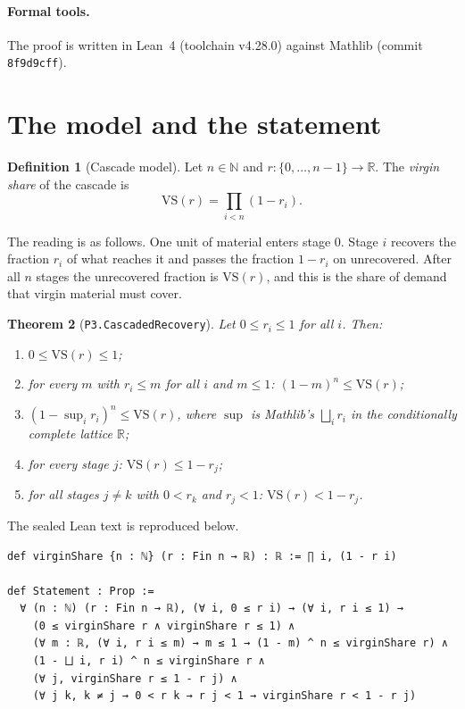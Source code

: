 \documentclass[11pt]{article}
\newtheorem{theorem}{Theorem}
\theoremstyle{definition}
\newtheorem{definition}[theorem]{Definition}
\theoremstyle{remark}
\begin{document}
\paragraph{Formal tools.}
The proof is written in Lean~4 \citep{moura2021lean4} (toolchain v4.28.0) against Mathlib
\citep{mathlib2020} (commit \texttt{8f9d9cff}).

\section{The model and the statement}
\label{sec:model}
\begin{definition}[Cascade model]
Let $n\in\mathbb{N}$ and $r:\{0,\dots,n-1\}\to\mathbb{R}$. The \emph{virgin share} of the cascade
is
\[
\mathrm{VS}(r)=\prod_{i<n}(1-r_i).
\]
\end{definition}
The reading is as follows. One unit of material enters stage $0$. Stage $i$ recovers the fraction
$r_i$ of what reaches it and passes the fraction $1-r_i$ on unrecovered. After all $n$ stages the
unrecovered fraction is $\mathrm{VS}(r)$, and this is the share of demand that virgin material
must cover.

\begin{theorem}[\texttt{P3.CascadedRecovery}]\label{thm:main}
Let $0\le r_i\le1$ for all $i$. Then:
\begin{enumerate}
\item $0\le\mathrm{VS}(r)\le1$;
\item for every $m$ with $r_i\le m$ for all $i$ and $m\le1$: $(1-m)^n\le\mathrm{VS}(r)$;
\item $(1-\sup_i r_i)^n\le\mathrm{VS}(r)$, where $\sup$ is Mathlib's $\bigsqcup_i r_i$ in the
conditionally complete lattice $\mathbb{R}$;
\item for every stage $j$: $\mathrm{VS}(r)\le 1-r_j$;
\item for all stages $j\ne k$ with $0<r_k$ and $r_j<1$: $\mathrm{VS}(r)<1-r_j$.
\end{enumerate}
\end{theorem}

The sealed Lean text is reproduced below.

\begin{lstlisting}[caption={Definition and \texttt{Statement} from the sealed module \texttt{ViridisStatements.P3.CascadedRecovery} (docstrings omitted).}]
def virginShare {n : ℕ} (r : Fin n → ℝ) : ℝ := ∏ i, (1 - r i)

def Statement : Prop :=
  ∀ (n : ℕ) (r : Fin n → ℝ), (∀ i, 0 ≤ r i) → (∀ i, r i ≤ 1) →
    (0 ≤ virginShare r ∧ virginShare r ≤ 1) ∧
    (∀ m : ℝ, (∀ i, r i ≤ m) → m ≤ 1 → (1 - m) ^ n ≤ virginShare r) ∧
    (1 - ⨆ i, r i) ^ n ≤ virginShare r ∧
    (∀ j, virginShare r ≤ 1 - r j) ∧
    (∀ j k, k ≠ j → 0 < r k → r j < 1 → virginShare r < 1 - r j)
\end{lstlisting}
\end{document}
